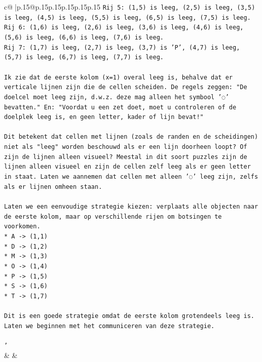 \documentclass{article}
\begin{document}
{\begin{supertabular}{c@{$\;$}|p{.15\linewidth}@{}p{.15\linewidth}p{.15\linewidth}p{.15\linewidth}p{.15\linewidth}p{.15\linewidth}}
{{{\texttt{Rij 5: (1,5) is leeg, (2,5) is leeg, (3,5) is leeg, (4,5) is leeg, (5,5) is leeg, (6,5) is leeg, (7,5) is leeg.} \\
\texttt{Rij 6: (1,6) is leeg, (2,6) is leeg, (3,6) is leeg, (4,6) is leeg, (5,6) is leeg, (6,6) is leeg, (7,6) is leeg.} \\
\texttt{Rij 7: (1,7) is leeg, (2,7) is leeg, (3,7) is 'P', (4,7) is leeg, (5,7) is leeg, (6,7) is leeg, (7,7) is leeg.} \\
\\ 
\texttt{Ik zie dat de eerste kolom (x=1) overal leeg is, behalve dat er verticale lijnen zijn die de cellen scheiden. De regels zeggen: "De doelcel moet leeg zijn, d.w.z. deze mag alleen het symbool '◌' bevatten." En: "Voordat u een zet doet, moet u controleren of de doelplek leeg is, en geen letter, kader of lijn bevat!"} \\
\\ 
\texttt{Dit betekent dat cellen met lijnen (zoals de randen en de scheidingen) niet als "leeg" worden beschouwd als er een lijn doorheen loopt? Of zijn de lijnen alleen visueel? Meestal in dit soort puzzles zijn de lijnen alleen visueel en zijn de cellen zelf leeg als er geen letter in staat. Laten we aannemen dat cellen met alleen '◌' leeg zijn, zelfs als er lijnen omheen staan.} \\
\\ 
\texttt{Laten we een eenvoudige strategie kiezen: verplaats alle objecten naar de eerste kolom, maar op verschillende rijen om botsingen te voorkomen.} \\
\texttt{*   A {-}> (1,1)} \\
\texttt{*   D {-}> (1,2)} \\
\texttt{*   M {-}> (1,3)} \\
\texttt{*   O {-}> (1,4)} \\
\texttt{*   P {-}> (1,5)} \\
\texttt{*   S {-}> (1,6)} \\
\texttt{*   T {-}> (1,7)} \\
\\ 
\texttt{Dit is een goede strategie omdat de eerste kolom grotendeels leeg is. Laten we beginnen met het communiceren van deze strategie.} \\
\\ 
\texttt{'} \\
            }
        }
    }
    & & \\ \\


\end{supertabular}}
\end{document}

